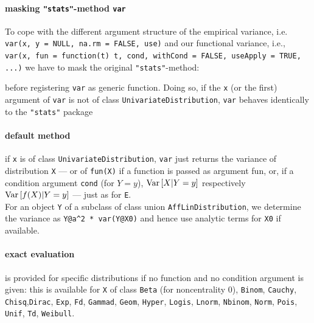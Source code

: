 \documentclass[11pt]{article}
\newcommand{\code}[1]{{\tt #1}}
\newcommand{\pkg}[1]{{\tt "#1"}}
\begin{document}
\paragraph{masking \pkg{stats}-method \code{var}}
To cope with the different argument structure of the empirical variance,
i.e. \code{var(x, y = NULL, na.rm = FALSE, use)}  and our functional variance, 
i.e., 
\code{var(x, fun = function(t) {t}, cond, withCond = FALSE, useApply = TRUE, ...)}
we have to mask the original \pkg{stats}-method:
\begin{Schunk}
\end{Schunk}
before registering \code{var} as generic function.
Doing so, if the \code{x} (or the first) argument of \code{var}
is not of class \code{UnivariateDistribution}, \code{var} behaves identically to
the \pkg{stats} package
\paragraph{default method} if \code{x} is of class \code{UnivariateDistribution}, 
\code{var} just returns the variance of distribution \code{X} --- or 
of \code{fun(X)} if a function is passed as argument fun, or, if a condition 
argument \code{cond} (for $Y=y$),  ${\rm Var}\,[X|Y=y]$ respectively 
${\rm Var}\,[f(X)|Y=y]$ --- just as for \code{E}. \\
For an object \code{Y} of a subclass of class 
union \code{AffLinDistribution}, we determine the variance as 
\code{Y@a\textasciicircum2 * var(Y@X0)} and hence use analytic terms for \code{X0} if
available.
\paragraph{exact evaluation} is provided for specific distributions if no 
function and no condition argument is given:
this is available for \code{X} of class \code{Beta} (for noncentrality $0$), 
\code{Binom}, \code{Cauchy}, \code{Chisq},\code{Dirac}, \code{Exp}, \code{Fd}, 
\code{Gammad}, \code{Geom}, \code{Hyper}, \code{Logis}, \code{Lnorm}, 
\code{Nbinom}, \code{Norm}, \code{Pois}, \code{Unif}, \code{Td}, \code{Weibull}.
\end{document}
